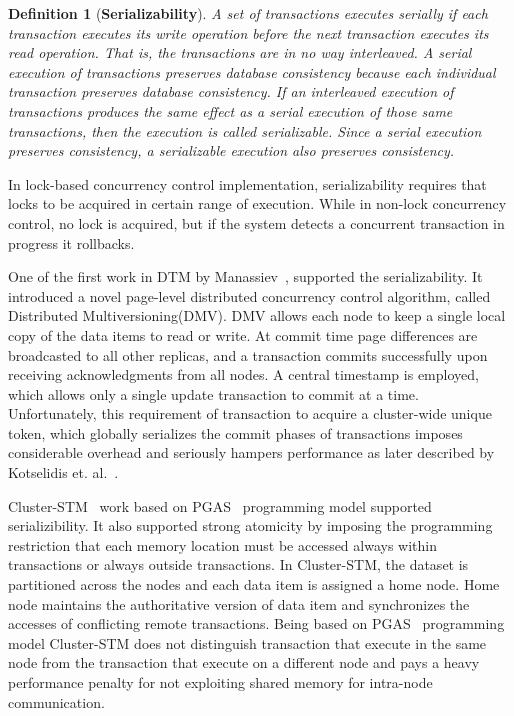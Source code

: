\documentclass[12pt,english]{report}
\newtheorem{definition}{Definition}[section]
\begin{document}
\begin{definition}[\textbf{Serializability}]
A set of transactions executes serially if each transaction executes its write operation before the next transaction executes its read operation. That is, the transactions are in no way interleaved. A serial execution of transactions preserves database consistency because each individual transaction preserves
database consistency. If an interleaved execution of transactions produces the same effect as a serial execution of those same transactions, then the execution is called serializable. Since a serial execution preserves consistency, a serializable execution also preserves consistency.~\cite{serializabilityFormal}
\end{definition}

In lock-based concurrency control implementation, serializability requires that locks to be acquired in certain range of execution. While in non-lock concurrency control, no lock is acquired, but if the system detects a concurrent transaction in progress it rollbacks.

One of the first work in DTM by Manassiev~\cite{Manassiev:2006:EDV:1122971.1123002}, supported the serializability. It introduced a novel page-level distributed concurrency control algorithm, called Distributed Multiversioning(DMV). DMV allows each node to keep a single local copy of the data items to read or write. At commit time page differences are broadcasted to all other replicas, and a transaction commits successfully upon receiving acknowledgments from all nodes. A central timestamp is employed, which allows only a single update transaction to commit at a time. Unfortunately, this requirement of transaction to acquire a cluster-wide unique token, which globally serializes the commit phases of transactions imposes considerable overhead and seriously hampers performance as later described by Kotselidis et. al.~\cite{Kotselidis08distm:a}.

Cluster-STM~\cite{Bocchino:2008:STM:1345206.1345242} work based on PGAS~\cite{PGAS:Programmin:Model} programming model supported serializibility. It also supported strong atomicity by imposing the programming restriction that each memory location must be accessed always within transactions or always outside transactions. In Cluster-STM, the dataset is partitioned across the nodes and each data item is assigned a home node. Home node maintains the authoritative version of data item and synchronizes the accesses of conflicting remote transactions. Being based on PGAS~\cite{PGAS:Programmin:Model} programming model Cluster-STM does not distinguish transaction that execute in the same node from the transaction that execute on a different node and pays a heavy performance penalty for not exploiting shared memory for intra-node communication.
\end{document}
